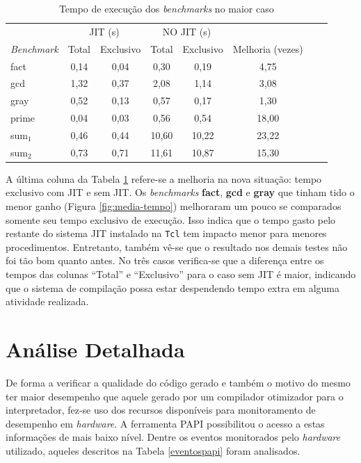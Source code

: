 \begin{table}[ht!]
  \caption{Tempo de execução dos \textit{benchmarks} no maior caso\label{tabela-execacc}}
  \centering
  \begin{tabular}{l c c c c c c r}
    \toprule
& \multicolumn{2}{c}{JIT (s)} & \multicolumn{2}{c}{NO JIT (s)} \\
\cmidrule(r){2-3} \cmidrule(r){4-5}
    \textit{Benchmark}  & Total & Exclusivo & Total & Exclusivo & Melhoria (vezes) \\
    \midrule
    fact & 0,14 & 0,04  & 0,30 & 0,19  & 4,75    \\
    gcd & 1,32 & 0,37  & 2,08 & 1,14  & 3,08   \\
    gray & 0,52 & 0,13  & 0,57 & 0,17   & 1,30   \\
    prime & 0,04 & 0,03 & 0,56 & 0,54   & 18,00     \\
    sum$_1$ & 0,46 & 0,44 & 10,60 & 10,22   & 23,22    \\
    sum$_2$ & 0,73 & 0,71 & 11,61 & 10,87   & 15,30     \\
    \bottomrule
  \end{tabular}
\end{table}

A última coluna da Tabela \ref{tabela-execacc} refere-se a melhoria na
nova situação: tempo exclusivo com JIT e sem JIT. Os
\textit{benchmarks} \textbf{fact}, \textbf{gcd} e \textbf{gray} que
tinham tido o menor ganho (Figura \ref{fig:media-tempo}) melhoraram um
pouco se comparados somente seu tempo exclusivo de execução. Isso
indica que o tempo gasto pelo restante do sistema JIT instalado na
\texttt{Tcl} tem impacto menor para menores procedimentos. Entretanto,
também vê-se que o resultado nos demais testes não
foi tão bom quanto antes. No três casos verifica-se que a diferença
entre os tempos das colunas ``Total'' e ``Exclusivo'' para o caso sem
JIT é maior, indicando que o sistema de compilação possa estar
despendendo tempo extra em alguma atividade realizada.

\section{Análise Detalhada}

De forma a verificar a qualidade do código gerado e também o motivo
do mesmo ter maior desempenho que aquele gerado por um compilador
otimizador para o interpretador, fez-se uso dos recursos disponíveis
para monitoramento de desempenho em \textit{hardware}. A ferramenta
PAPI possibilitou o acesso a estas informações de mais baixo
nível. Dentre os eventos monitorados pelo \textit{hardware} utilizado,
aqueles descritos na Tabela \ref{eventospapi} foram analisados.

